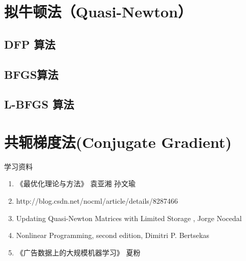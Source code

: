 \section{拟牛顿法（Quasi-Newton）}
\subsection{DFP 算法}
\subsection{BFGS算法}
\subsection{L-BFGS 算法}


\section{共轭梯度法(Conjugate Gradient)}
学习资料
\begin{enumerate}
\item《最优化理论与方法》 袁亚湘 孙文瑜
\item http://blog.csdn.net/nocml/article/details/8287466
\item Updating Quasi-Newton Matrices with Limited Storage , Jorge Nocedal
\item Nonlinear Programming, second edition, Dimitri P. Bertsekas
\item《广告数据上的大规模机器学习》  夏粉
\end{enumerate}

\ifx\mlbook\undefined
    
\fi
